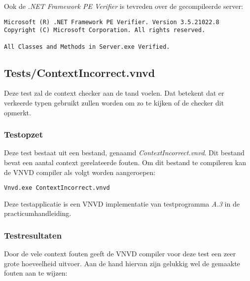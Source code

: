 Ook de \textit{.NET Framework PE Verifier} is tevreden over de gecompileerde server:

\begin{lstlisting}
Microsoft (R) .NET Framework PE Verifier. Version 3.5.21022.8
Copyright (C) Microsoft Corporation. All rights reserved.

All Classes and Methods in Server.exe Verified.
\end{lstlisting}

\subsection{Tests/ContextIncorrect.vnvd}
Deze test zal de context checker aan de tand voelen. Dat betekent dat er verkeerde typen gebruikt zullen worden om zo te kijken of de checker dit opmerkt.

\subsubsection{Testopzet}
Deze test bestaat uit een bestand, genaamd \textit{ContextIncorrect.vnvd}. Dit bestand bevat een aantal context gerelateerde fouten. Om dit bestand te compileren kan de VNVD compiler als volgt worden aangeroepen:

\begin{lstlisting}
Vnvd.exe ContextIncorrect.vnvd
\end{lstlisting}

Deze testapplicatie is een VNVD implementatie van testprogramma \textit{A.3} in de practicumhandleiding.

\subsubsection{Testresultaten}
Door de vele context fouten geeft de VNVD compiler voor deze test een zeer grote hoeveelheid uitvoer. Aan de hand hiervan zijn gelukkig wel de gemaakte fouten aan te wijzen:

